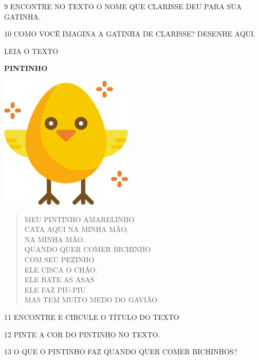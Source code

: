 \num{9} ENCONTRE NO TEXTO O NOME QUE CLARISSE DEU PARA SUA GATINHA.


\num{10} COMO VOCÊ IMAGINA A GATINHA DE CLARISSE? DESENHE AQUI.


LEIA O TEXTO

\textbf{PINTINHO}

\includegraphics[width=2.51042in,height=2.51042in]{media/image129.png}
\begin{verse}
MEU PINTINHO AMARELINHO\\
CATA AQUI NA MINHA MÃO,\\
NA MINHA MÃO.\\
QUANDO QUER COMER BICHINHO\\
COM SEU PEZINHO\\
ELE CISCA O CHÃO.\\
ELE BATE AS ASAS\\
ELE FAZ PIU-PIU\\
MAS TEM MUITO MEDO DO GAVIÃO.
\end{verse}



\num{11} ENCONTRE E CIRCULE O TÍTULO DO TEXTO

\num{12} PINTE A COR DO PINTINHO NO TEXTO.

\num{13} O QUE O PINTINHO FAZ QUANDO QUER COMER BICHINHOS?


